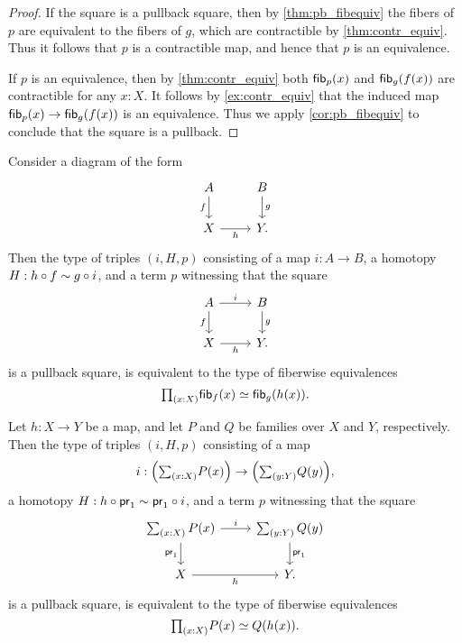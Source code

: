 \begin{proof}
If the square is a pullback square, then by \cref{thm:pb_fibequiv} the fibers of $p$ are equivalent to the fibers of $g$, which are contractible by \cref{thm:contr_equiv}. Thus it follows that $p$ is a contractible map, and hence that $p$ is an equivalence.

If $p$ is an equivalence, then by \cref{thm:contr_equiv} both $\mathsf{fib}_{p}(x)$ and $\mathsf{fib}_{g}(f(x))$ are contractible for any $x:X$. It follows by \cref{ex:contr_equiv} that the induced map $\mathsf{fib}_{p}(x)\to\mathsf{fib}_{g}(f(x))$ is an equivalence. Thus we apply \cref{cor:pb_fibequiv} to conclude that the square is a pullback.
\end{proof}

\begin{prp}\label{thm:pb_fibequiv_complete}
Consider a diagram of the form
\begin{equation*}
\begin{tikzcd}
A \arrow[d,swap,"f"] & B \arrow[d,"g"] \\
X \arrow[r,swap,"h"] & Y.
\end{tikzcd}
\end{equation*}
Then the type of triples $(i,H,p)$ consisting of a map $i:A\to B$, a homotopy $H:h\circ f\sim g\circ i$, and a term $p$ witnessing that the square
\begin{equation*}
\begin{tikzcd}
A \arrow[d,swap,"f"] \arrow[r,"i"] & B \arrow[d,"g"] \\
X \arrow[r,swap,"h"] & Y.
\end{tikzcd}
\end{equation*}
is a pullback square, is equivalent to the type of fiberwise equivalences
\begin{equation*}
\prd{x:X}\eqv{\fib{f}{x}}{\fib{g}{h(x)}}.
\end{equation*}
\end{prp}

\begin{cor}\label{cor:pb_fibequiv_complete}
Let $h:X\to Y$ be a map, and let $P$ and $Q$ be families over $X$ and $Y$, respectively.
Then the type of triples $(i,H,p)$ consisting of a map 
\begin{equation*}
i:\Big(\sm{x:X}P(x)\Big)\to \Big(\sm{y:Y}Q(y)\Big),
\end{equation*}
a homotopy $H:h\circ \mathsf{pr}_{1}\sim \mathsf{pr}_{1}\circ i$, and a term $p$ witnessing that the square
\begin{equation*}
\begin{tikzcd}
\sm{x:X}P(x) \arrow[d,swap,"\proj 1"] \arrow[r,"i"] & \sm{y:Y}Q(y) \arrow[d,"\proj 1"] \\
X \arrow[r,swap,"h"] & Y.
\end{tikzcd}
\end{equation*}
is a pullback square, is equivalent to the type of fiberwise equivalences
\begin{equation*}
\prd{x:X}\eqv{P(x)}{Q(h(x))}.
\end{equation*}
\end{cor}

